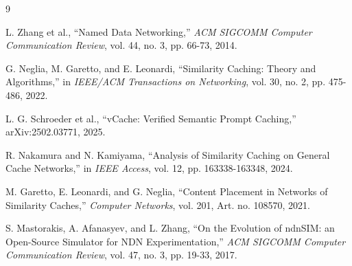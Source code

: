 \documentclass[12pt,a4paper]{article}
\begin{document}
\begin{thebibliography}{9}

L. Zhang et al., ``Named Data Networking,'' \textit{ACM SIGCOMM Computer Communication Review},
vol. 44, no. 3, pp. 66-73, 2014.

G. Neglia, M. Garetto, and E. Leonardi, ``Similarity Caching: Theory and Algorithms,'' in
\textit{IEEE/ACM Transactions on Networking}, vol. 30, no. 2, pp. 475-486, 2022.

L. G. Schroeder et al., ``vCache: Verified Semantic Prompt Caching,'' arXiv:2502.03771, 2025.

R. Nakamura and N. Kamiyama, ``Analysis of Similarity Caching on General Cache Networks,'' in
\textit{IEEE Access}, vol. 12, pp. 163338-163348, 2024.

M. Garetto, E. Leonardi, and G. Neglia, ``Content Placement in Networks of Similarity Caches,''
\textit{Computer Networks}, vol. 201, Art. no. 108570, 2021.

S. Mastorakis, A. Afanasyev, and L. Zhang, ``On the Evolution of ndnSIM: an Open-Source Simulator
for NDN Experimentation,'' \textit{ACM SIGCOMM Computer Communication Review}, vol. 47, no. 3,
pp. 19-33, 2017.

\end{thebibliography}
\end{document}
